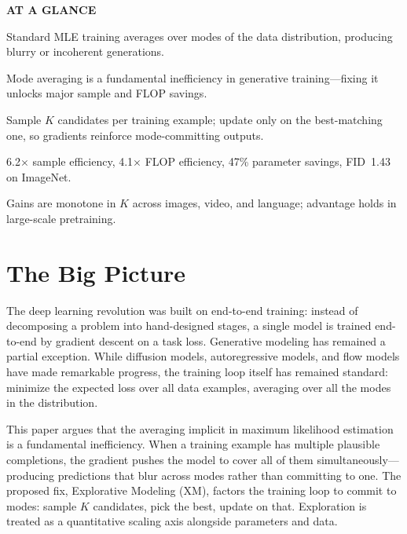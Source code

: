 \documentclass[10pt,twocolumn]{article}
\begin{document}
\begin{mdframed}[backgroundcolor=boxgray,linecolor=rulered,linewidth=1pt,
    innerleftmargin=6pt,innerrightmargin=6pt,
    innertopmargin=6pt,innerbottommargin=6pt]
\textbf{\small AT A GLANCE}\par\vspace{4pt}
\begin{description}[leftmargin=0pt,labelsep=4pt,itemsep=2pt,parsep=0pt,
    font=\small\bfseries]
  \item[Problem:] Standard MLE training averages over modes of the
    data distribution, producing blurry or incoherent generations.
  \item[Why it matters:] Mode averaging is a fundamental inefficiency in
    generative training---fixing it unlocks major sample and FLOP savings.
  \item[Method:] Sample $K$ candidates per training example; update only
    on the best-matching one, so gradients reinforce mode-committing outputs.
  \item[Result:] 6.2$\times$ sample efficiency, 4.1$\times$ FLOP
    efficiency, 47\% parameter savings, FID~1.43 on ImageNet.
  \item[Evidence:] Gains are monotone in $K$ across images, video, and
    language; advantage holds in large-scale pretraining.
\end{description}
\end{mdframed}

\section{The Big Picture}

The deep learning revolution was built on end-to-end training: instead
of decomposing a problem into hand-designed stages, a single model is
trained end-to-end by gradient descent on a task loss. Generative
modeling has remained a partial exception. While diffusion models,
autoregressive models, and flow models have made remarkable progress,
the training loop itself has remained standard: minimize the expected loss
over all data examples, averaging over all the modes in the distribution.

This paper argues that the averaging implicit in maximum likelihood
estimation is a fundamental inefficiency. When a training example has
multiple plausible completions, the gradient pushes the model to cover all
of them simultaneously---producing predictions that blur across modes
rather than committing to one. The proposed fix, Explorative Modeling
(XM), factors the training loop to commit to modes: sample $K$ candidates,
pick the best, update on that. Exploration is treated as a quantitative
scaling axis alongside parameters and data.
\end{document}
